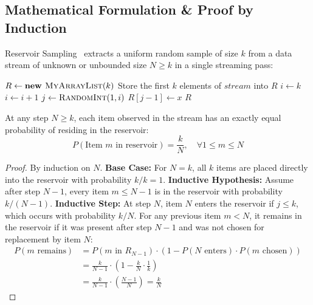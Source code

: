 \subsection{Mathematical Formulation \& Proof by Induction}
Reservoir Sampling~\cite{clrs2009} extracts a uniform random sample of size $k$ from a data stream of unknown or unbounded size $N \ge k$ in a single streaming pass:
\begin{algorithm}[H]
\caption{Reservoir Sampling (Algorithm R)}
\begin{algorithmic}[1]
    \State $R \gets \textbf{new } \Call{MyArrayList}{k}$
    \State Store the first $k$ elements of $stream$ into $R$
    \State $i \gets k$
        \State $i \gets i + 1$
        \State $j \gets \Call{RandomInt}{1, i}$ 
            \State $R[j - 1] \gets x$
        \EndIf
    \EndWhile
    \State \Return $R$
\EndFunction
\end{algorithmic}
\end{algorithm}

\begin{theorem}
At any step $N \ge k$, each item observed in the stream has an exactly equal probability of residing in the reservoir:
\begin{equation}
P(\text{Item } m \text{ in reservoir}) = \frac{k}{N}, \quad \forall 1 \le m \le N
\end{equation}
\end{theorem}
\begin{proof}
By induction on $N$. 
\textbf{Base Case:} For $N = k$, all $k$ items are placed directly into the reservoir with probability $k/k = 1$.
\textbf{Inductive Hypothesis:} Assume after step $N - 1$, every item $m \le N - 1$ is in the reservoir with probability $k / (N - 1)$.
\textbf{Inductive Step:} At step $N$, item $N$ enters the reservoir if $j \le k$, which occurs with probability $k/N$. 
For any previous item $m < N$, it remains in the reservoir if it was present after step $N - 1$ and was not chosen for replacement by item $N$:
\begin{align}
P(m \text{ remains}) &= P(m \text{ in } R_{N-1}) \cdot \left( 1 - P(N \text{ enters}) \cdot P(m \text{ chosen}) \right) \nonumber \\
&= \frac{k}{N - 1} \cdot \left( 1 - \frac{k}{N} \cdot \frac{1}{k} \right) \nonumber \\
&= \frac{k}{N - 1} \cdot \left( \frac{N - 1}{N} \right) = \frac{k}{N}
\end{align}
\end{proof}

